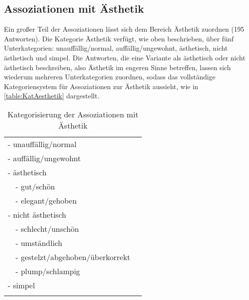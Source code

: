 \subsection{Assoziationen mit Ästhetik}
\label{sec:ErgAssAes}
Ein großer Teil der Assoziationen lässt sich dem Bereich Ästhetik zuordnen (195 Antworten). 
Die Kategorie \glqq Ästhetik\grqq{} verfügt, wie oben beschrieben, über fünf Unterkategorien: \glqq unauffällig/normal\grqq, \glqq auffällig/ungewohnt\grqq, \glqq ästhetisch\grqq, \glqq nicht ästhetisch\grqq{} und \glqq simpel\grqq. 
Die Antworten, die eine Variante als \glqq ästhetisch\grqq{} oder \glqq nicht ästhetisch\grqq{} beschreiben, also Ästhetik im engeren Sinne betreffen, lassen sich wiederum mehreren Unterkategorien zuordnen, sodass das vollständige Kategoriensystem für Assoziationen zur Ästhetik aussieht, wie in \autoref{table:KatAesthetik} dargestellt.  
\begin{table}
\centering
\begin{tabular}{lll}
\lsptoprule
\multicolumn{2}{l}{Ästhetik} \\
\midrule
\multicolumn{2}{l}{- unauffällig/normal} \\
\multicolumn{2}{l}{- auffällig/ungewohnt} \\
\multicolumn{2}{l}{- ästhetisch} \\
 & - gut/schön \\ 
 & - elegant/gehoben \\
\multicolumn{2}{l}{- nicht ästhetisch} \\
 & - schlecht/unschön \\ 
 & - umständlich \\ 
 & - gestelzt/abgehoben/überkorrekt\\
 & - plump/schlampig \\ \hline
\multicolumn{2}{l}{- simpel}\\ 
\lspbottomrule
\end{tabular}
\caption{Kategorisierung der Assoziationen mit Ästhetik}
\label{table:KatAesthetik}
\end{table}

